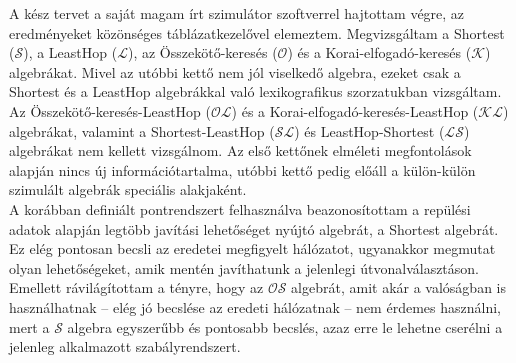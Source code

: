   A kész tervet a saját magam írt szimulátor szoftverrel hajtottam végre, az eredményeket közönséges táblázatkezelővel elemeztem. Megvizsgáltam a Shortest ($\mathcal{S}$), a LeastHop ($\mathcal{L}$), az Összekötő-keresés ($\mathcal{O}$) és a Korai-elfogadó-keresés ($\mathcal{K}$) algebrákat. Mivel az utóbbi kettő nem jól viselkedő algebra, ezeket csak a Shortest és a LeastHop algebrákkal való lexikografikus szorzatukban vizsgáltam. Az Összekötő-keresés-LeastHop ($\mathcal{OL}$) és a Korai-elfogadó-keresés-LeastHop ($\mathcal{KL}$) algebrákat, valamint a Shortest-LeastHop ($\mathcal{SL}$) és LeastHop-Shortest ($\mathcal{LS}$) algebrákat nem kellett vizsgálnom. Az első kettőnek elméleti megfontolások alapján nincs új információtartalma, utóbbi kettő pedig előáll a külön-külön szimulált algebrák speciális alakjaként.\\

  A korábban definiált pontrendszert felhasználva beazonosítottam a repülési adatok alapján legtöbb javítási lehetőséget nyújtó algebrát, a Shortest algebrát. Ez elég pontosan becsli az eredetei megfigyelt hálózatot, ugyanakkor megmutat olyan lehetőségeket, amik mentén javíthatunk a jelenlegi útvonalválasztáson.
  Emellett rávilágítottam a tényre, hogy az $\mathcal{OS}$ algebrát, amit akár a valóságban is használhatnak -- elég jó becslése az eredeti hálózatnak -- nem érdemes használni, mert a $\mathcal{S}$ algebra egyszerűbb és pontosabb becslés, azaz erre le lehetne cserélni a jelenleg alkalmazott szabályrendszert.
